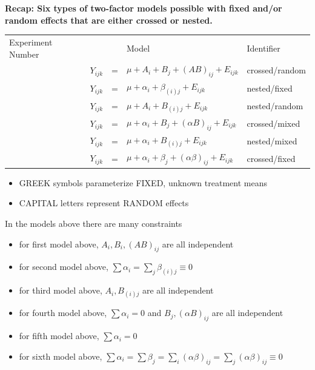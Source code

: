 \textbf{Recap:  Six types of two-factor models possible with fixed and/or random effects that are either crossed or nested.}
\begin{center}
\begin{tabular}{l|ccl|l}
Experiment Number & && Model & Identifier\\
\underbar{~~~~~} 
& $Y_{ijk}$&=&$\mu + A_i + B_j + (AB)_{ij} + E_{ijk}$  & \mbox{crossed/random} \\
\underbar{~~~~~} 
& $Y_{ijk}$&=&$\mu + \alpha_i + \beta_{(i)j} + E_{ijk}$ &  \mbox{nested/fixed} \\
\underbar{~~~~~} 
& $Y_{ijk}$&=&$\mu + A_i + B_{(i)j} + E_{ijk}$  & \mbox{nested/random} \\
\underbar{~~~~~} 
& $Y_{ijk}$&=&$\mu + \alpha_i + B_j + (\alpha B)_{ij} + E_{ijk}$  & \mbox{crossed/mixed} \\
\underbar{~~~~~} 
& $Y_{ijk}$&=&$\mu + \alpha_i + B_{(i)j} + E_{ijk}$  & \mbox{nested/mixed} \\
\underbar{~~~~~} 
& $Y_{ijk}$&=&$\mu + \alpha_i + \beta_j + (\alpha\beta)_{ij} + E_{ijk}$ & \mbox{crossed/fixed} \\
\end{tabular}
\end{center}

\begin{itemize}
\item GREEK symbols parameterize FIXED, unknown treatment means 
\item CAPITAL letters represent RANDOM effects
\end{itemize}
In the models above there are many constraints
\begin{itemize}
\item for first model above, $A_i,B_i,(AB)_{ij}$ are all independent
\item for second model above, $\sum \alpha_i = \sum_j \beta_{(i)j} \equiv  0$
\item for third model above, $A_i,B_{(i)j}$ are all independent
\item for fourth model above, $\sum \alpha_i=0$ and $B_j,(\alpha B)_{ij}$ are all independent
\item for fifth model above, $\sum \alpha_i=0$ 
\item for sixth model above, $\sum \alpha_i = \sum \beta_j = \sum_i (\alpha\beta)_{ij} = \sum_j (\alpha\beta)_{ij} \equiv 0$
\end{itemize}

\newpage

